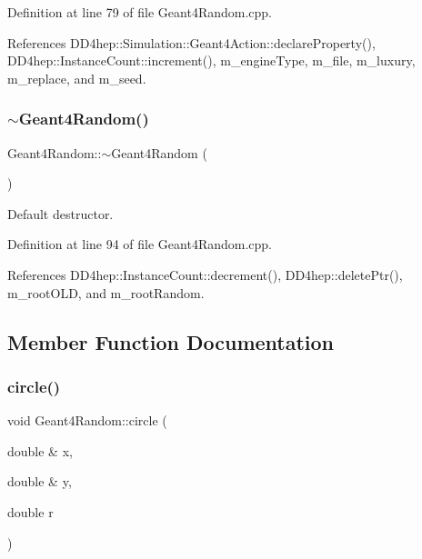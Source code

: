 Definition at line 79 of file Geant4\+Random.\+cpp.



References D\+D4hep\+::\+Simulation\+::\+Geant4\+Action\+::declare\+Property(), D\+D4hep\+::\+Instance\+Count\+::increment(), m\+\_\+engine\+Type, m\+\_\+file, m\+\_\+luxury, m\+\_\+replace, and m\+\_\+seed.

\hypertarget{class_d_d4hep_1_1_simulation_1_1_geant4_random_a36518f1890fdb6177b2296b5f905fb07}{}\label{class_d_d4hep_1_1_simulation_1_1_geant4_random_a36518f1890fdb6177b2296b5f905fb07} 
\subsubsection{\texorpdfstring{$\sim$\+Geant4\+Random()}{~Geant4Random()}}
{\footnotesize\ttfamily Geant4\+Random\+::$\sim$\+Geant4\+Random (\begin{DoxyParamCaption}{ }\end{DoxyParamCaption})\hspace{0.3cm}{\ttfamily [virtual]}}



Default destructor. 



Definition at line 94 of file Geant4\+Random.\+cpp.



References D\+D4hep\+::\+Instance\+Count\+::decrement(), D\+D4hep\+::delete\+Ptr(), m\+\_\+root\+O\+LD, and m\+\_\+root\+Random.



\subsection{Member Function Documentation}
\hypertarget{class_d_d4hep_1_1_simulation_1_1_geant4_random_a1319236bb57ff830f1d575dbe928cb01}{}\label{class_d_d4hep_1_1_simulation_1_1_geant4_random_a1319236bb57ff830f1d575dbe928cb01} 
\subsubsection{\texorpdfstring{circle()}{circle()}}
{\footnotesize\ttfamily void Geant4\+Random\+::circle (\begin{DoxyParamCaption}\item[{double \&}]{x,  }\item[{double \&}]{y,  }\item[{double}]{r }\end{DoxyParamCaption})}




